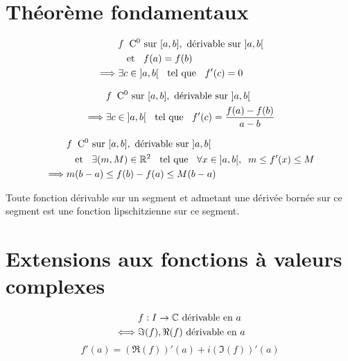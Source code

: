 \section{Théorème fondamentaux}

\begin{thm}[de Rolle]
\begin{align*}
            &f \;\; \co{0} \sur {[a, b]}, \drv \e \sur {]a, b[} \\
            &\et f(a) = f(b) \\
\implies    &\exists c \in {]a, b[} \tq f'(c) = 0 \\
\end{align*}
\end{thm}

\begin{thm}
\begin{align*}
            &f \;\; \co{0} \sur {[a, b]}, \drv \e \sur {]a, b[} \\
\implies    &\exists c \in {]a, b[}
                \tq f'(c) = \frac{f(a) - f(b)}{a - b}
\end{align*}
\end{thm}

\begin{prp}
\begin{align*}
            &f \;\; \co{0} \sur {[a, b]}, \drv \e \sur {]a, b[} \\
            &\et \exists (m, M) \in \R^2 \tq \forall x \in {]a, b[}, \;\;
                m \leq f'(x) \leq M \\
\implies    &m(b - a) \leq f(b) - f(a) \leq M(b - a)
\end{align*}
\end{prp}

\begin{prp}
Toute fonction dérivable sur un segment et admetant une dérivée bornée
sur ce segment est une fonction lipschitzienne sur ce segment.
\end{prp}


\section{Extensions aux fonctions à valeurs complexes}

\begin{dfn}
\begin{align*}
        &f : I \to \C \drv \e \en a \\
\iff    &\Im(f), \Re(f) \drv \e \en a
\end{align*}
\[
    f'(a) = (\Re(f))'(a) + i(\Im(f))'(a) 
\]
\end{dfn}

